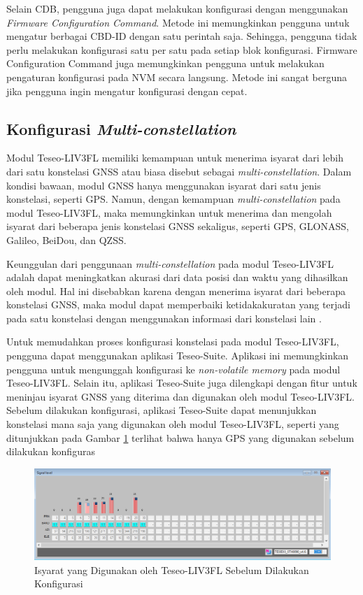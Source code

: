 Selain CDB, pengguna juga dapat melakukan konfigurasi dengan menggunakan \textit{Firmware Configuration Command}. Metode ini memungkinkan pengguna untuk mengatur berbagai CBD-ID dengan satu perintah saja. Sehingga, pengguna tidak perlu melakukan konfigurasi satu per satu pada setiap blok konfigurasi. Firmware Configuration Command juga memungkinkan pengguna untuk melakukan pengaturan konfigurasi pada NVM secara langsung. Metode ini sangat berguna jika pengguna ingin mengatur konfigurasi dengan cepat.

\subsection{Konfigurasi \textit{Multi-constellation}}
Modul Teseo-LIV3FL memiliki kemampuan untuk menerima isyarat dari lebih dari satu konstelasi GNSS atau biasa disebut sebagai \textit{multi-constellation}. Dalam kondisi bawaan, modul GNSS hanya menggunakan isyarat dari satu jenis konstelasi, seperti GPS. Namun, dengan kemampuan \textit{multi-constellation} pada modul Teseo-LIV3FL, maka memungkinkan untuk menerima dan mengolah isyarat dari beberapa jenis konstelasi GNSS sekaligus, seperti GPS, GLONASS, Galileo, BeiDou, dan QZSS.
 
Keunggulan dari penggunaan \textit{multi-constellation} pada modul Teseo-LIV3FL adalah dapat meningkatkan akurasi dari data posisi dan waktu yang dihasilkan oleh modul. Hal ini disebabkan karena dengan menerima isyarat dari beberapa konstelasi GNSS, maka modul dapat memperbaiki ketidakakuratan yang terjadi pada satu konstelasi dengan menggunakan informasi dari konstelasi lain \cite{An2020}.
 
 Untuk memudahkan proses konfigurasi konstelasi pada modul Teseo-LIV3FL, pengguna dapat menggunakan aplikasi Teseo-Suite. Aplikasi ini memungkinkan pengguna untuk mengunggah konfigurasi ke \textit{non-volatile memory} pada modul Teseo-LIV3FL. Selain itu, aplikasi Teseo-Suite juga dilengkapi dengan fitur untuk meninjau isyarat GNSS yang diterima dan digunakan oleh modul Teseo-LIV3FL. Sebelum dilakukan konfigurasi, aplikasi Teseo-Suite dapat menunjukkan konstelasi mana saja yang digunakan oleh modul Teseo-LIV3FL, seperti yang ditunjukkan pada Gambar \ref{Fig: sebelum-konfigurasi} terlihat bahwa hanya GPS yang digunakan sebelum dilakukan konfiguras
 
 \begin{figure}[H]
 	\centering
 	\includegraphics[width=14cm]{contents/chapter-3/setting-konstelasi/sebelum-konfigurasi.png}
 	\caption{Isyarat yang Digunakan oleh Teseo-LIV3FL Sebelum Dilakukan Konfigurasi}
 	\label{Fig: sebelum-konfigurasi}
 \end{figure}
 
